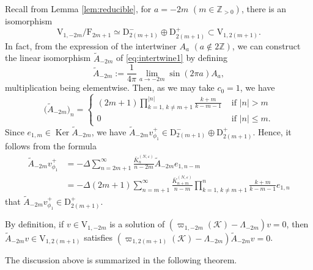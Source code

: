 \documentclass[11pt]{article}
\numberwithin{equation}{section}
\newcommand{\Z}{\mathbb{Z}} %
\newcommand{\e}{\varepsilon}
\DeclareMathOperator{\Ker}{Ker}
\newcommand{\RpnSymbol}[1]{\bm{\mathrm{#1}}}
\newcommand{\rF}{\RpnSymbol{F}}
\newcommand{\rV}{\RpnSymbol{V}}
\newcommand{\rD}{\RpnSymbol{D}}
\theoremstyle{plain}
\theoremstyle{definition}
\theoremstyle{remark}
\begin{document}
Recall from Lemma \ref{lem:reducible}, for \(a = -2m \) \((m \in \Z_{>0}) \), there is an isomorphism
\begin{equation}
  \label{eq:intertwine1}
  \rV_{1,-2 m}/\rF_{2m+1} \simeq \rD^-_{2(m+1)} \oplus \rD^+_{2(m+1)} \subset
   \rV_{1, 2(m+1)}.
\end{equation}
In fact, from the expression of the intertwiner \(A_a\) \( (a \not\in 2 \Z)\), we can construct the linear isomorphism
\(\tilde{A}_{-2m}\) of \eqref{eq:intertwine1} by defining
\[
  \tilde{A}_{-2m} := \frac{1}{4\pi}\lim_{a \to -2m} \sin(2\pi a)  A_a,
\]
multiplication being elementwise. Then, as we may take $c_0=1$, we have
\begin{equation}
  \big(\tilde{A}_{-2m}\big)_n=
  \begin{cases}
    (2m+1)\prod_{k=1, \, k\not=m+1}^{|n|} \frac{k+m}{k-m-1} &  \text{ if } |n|>m\\
    0  &  \text{ if } |n|\leq m.
\end{cases}
\end{equation}
Since $e_{1,m} \in \Ker\tilde{A}_{-2m}$, we have $\tilde{A}_{-2m} v^+_{\phi_1}  \in \rD^-_{2(m+1)} \oplus \rD^+_{2(m+1)}$.
Hence, it follows from the formula
\begin{align*}
 \tilde{A}_{-2m} v^+_{\phi_1}
 & =  - \Delta \sum_{n=2 m+1}^\infty \frac{\bar{K}^{(N,\e)}_n}{n - 2 m}   \tilde{A}_{-2m}e_{1,n-m}\\
 & = - \Delta    (2m+1)\sum_{n=m+1}^\infty \frac{\bar{K}^{(N,\e)}_{n+m}}{n -  m}  \prod_{k=1, \, k\not=m+1}^{n} \frac{k+m}{k-m-1}e_{1,n}
\end{align*}
that $\tilde{A}_{-2m} v^+_{\phi_1}  \in \rD^+_{2(m+1)}$.

By definition, if \(v \in \rV_{1,-2 m}\) is a solution of \((\varpi_{1,-2m}(\mathcal{K})- \Lambda_{-2m}) v = 0\), then \(\tilde{A}_{-2m}v \in \rV_{1,2(m+1)}\)
satisfies \((\varpi_{1,2(m+1)}(\mathcal{K})- \Lambda_{-2m}) \tilde{A}_{-2m}v = 0\).

The discussion above is summarized in the following theorem.
\end{document}
